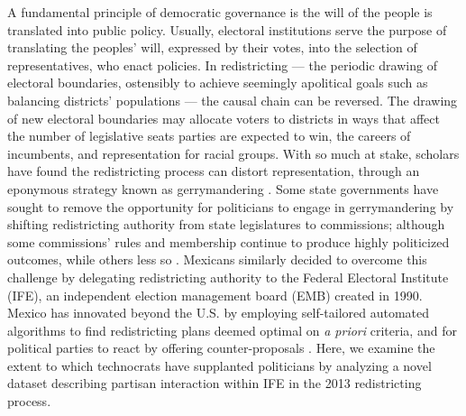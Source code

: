 \documentclass[letter,12pt]{article}
\begin{document}
A fundamental principle of democratic governance is the will of the people is translated into public policy. Usually, electoral institutions serve the purpose of translating the peoples' will, expressed by their votes, into the selection of representatives, who enact policies. In redistricting --- the periodic drawing of electoral boundaries, ostensibly to achieve seemingly apolitical goals such as balancing districts' populations --- the causal chain can be reversed. The drawing of new electoral boundaries may allocate voters to districts in ways that affect the number of legislative seats parties are expected to win, the careers of incumbents, and representation for racial groups. With so much at stake, scholars have found the redistricting process can distort representation, through an eponymous strategy known as gerrymandering \citep{mayhew1974vanishingMg,cox.katz.2002,erikson1972malapportionment,engstrom2006redisttrictApsr}. Some state governments have sought to remove the opportunity for politicians to engage in gerrymandering by shifting redistricting authority from state legislatures to commissions; although some commissions' rules and membership continue to produce highly politicized outcomes, while others less so \citep{mcdonald.CommVsLegisRedistrict2004,trelles.mtz.polygob2012}. Mexicans similarly decided to overcome this challenge by delegating redistricting authority to the Federal Electoral Institute (IFE), an independent election management board (EMB) created in 1990. Mexico has innovated beyond the U.S. by employing self-tailored automated algorithms to find redistricting plans deemed optimal on \emph{a priori} criteria, and for political parties to react by offering counter-proposals \citep{trelles.mtz.polygob2012}. Here, we examine the extent to which technocrats have supplanted politicians \citep{lujambio.vives.2008} by analyzing a novel dataset describing partisan interaction within IFE in the 2013 redistricting process.

\end{document}
